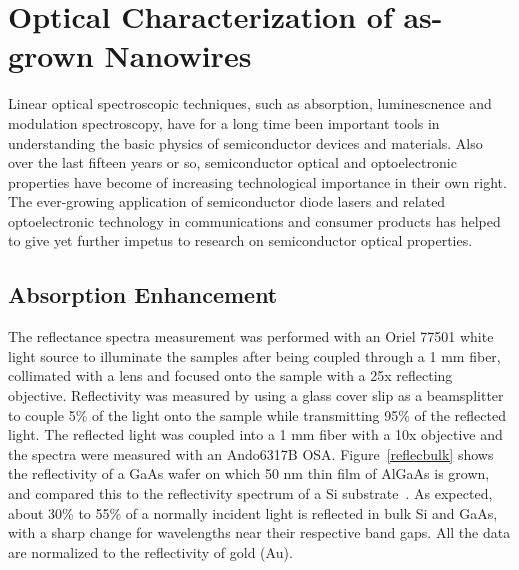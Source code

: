 \section{Optical Characterization of as-grown Nanowires}

Linear optical spectroscopic techniques, such as absorption, luminescnence and
modulation spectroscopy, have for a long time been important tools in
understanding the basic physics of semiconductor devices and materials. Also
over the last fifteen years or so, semiconductor optical and optoelectronic
properties have become of increasing technological importance in their own
right. The ever-growing application of semiconductor diode lasers and related
optoelectronic technology in communications and consumer products has helped to
give yet further impetus to research on semiconductor optical properties.

\subsection{Absorption Enhancement} \label{Data_Abs}

The reflectance spectra measurement was performed with an Oriel 77501 white
light source to illuminate the samples after being coupled through a 1 mm
fiber, collimated with a lens and focused onto the sample with a 25x reflecting
objective. Reflectivity was measured by using a glass cover slip as a
beamsplitter to couple 5\% of the light onto the sample while transmitting 95\%
of the reflected light. The reflected light was coupled into a 1 mm fiber with
a 10x objective and the spectra were measured with an Ando6317B OSA.
Figure~\ref{reflecbulk} shows the reflectivity of a GaAs wafer on which 50 nm
thin film of AlGaAs is grown, and compared this to the reflectivity spectrum of
a Si substrate~\cite{Wang:2013ux}. As expected, about 30\% to 55\% of a
normally incident light is reflected in bulk Si and GaAs, with a sharp change
for wavelengths near their respective band gaps. All the data are normalized to
the reflectivity of gold (Au).

